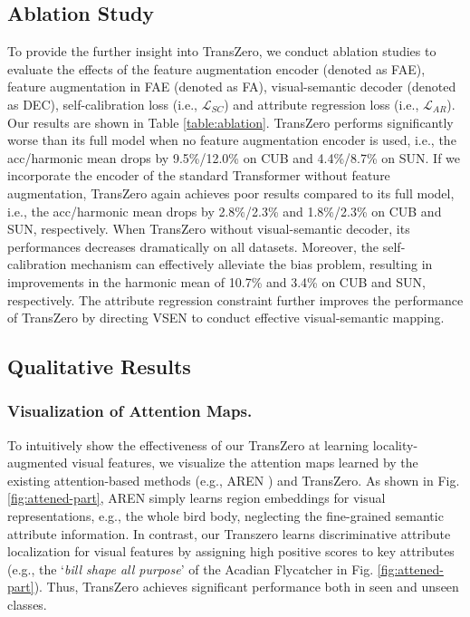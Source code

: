 \documentclass[letterpaper]{article} %
\begin{document}
	\subsection{Ablation Study}\label{sec4.2}	
	To provide the further insight into TransZero, we conduct ablation studies to evaluate the effects of the feature augmentation encoder (denoted as FAE), feature augmentation in FAE (denoted as FA), visual-semantic decoder (denoted as DEC), self-calibration loss (i.e., $\mathcal{L}_{SC}$) and attribute regression loss (i.e.,  $\mathcal{L}_{AR}$). Our results are shown in Table \ref{table:ablation}. TransZero performs significantly worse than its full model when no feature augmentation encoder is used, i.e., the acc/harmonic mean drops by 9.5\%/12.0\% on CUB and 4.4\%/8.7\% on SUN. If we incorporate the encoder of the standard Transformer without feature augmentation, TransZero again achieves poor results compared to its full model, i.e., the acc/harmonic mean drops by 2.8\%/2.3\% and 1.8\%/2.3\% on CUB and SUN, respectively. When TransZero without visual-semantic decoder, its performances decreases dramatically on all datasets. Moreover, the self-calibration mechanism can effectively alleviate the bias problem, resulting in improvements in the harmonic mean of 10.7\% and 3.4\% on CUB and SUN, respectively. The attribute regression constraint further improves the performance of TransZero by directing VSEN to conduct effective visual-semantic mapping.
	
	
	
	
	
	\subsection{Qualitative Results}\label{sec4.3}	
	\subsubsection{Visualization of Attention Maps.} To intuitively show the effectiveness of our TransZero at learning locality-augmented visual features, we visualize the attention maps learned by the existing attention-based methods (e.g., AREN \cite{Xie2019AttentiveRE}) and TransZero. As shown in Fig. \ref{fig:attened-part}, AREN simply learns region embeddings for visual representations, e.g., the whole bird body, neglecting the fine-grained semantic attribute information. In contrast, our Transzero learns discriminative attribute localization for visual features by assigning high positive scores to key attributes (e.g., the ‘\textit{bill shape all purpose}’ of the Acadian Flycatcher in Fig. \ref{fig:attened-part}). Thus, TransZero achieves significant performance both in seen and unseen classes.
	
\end{document}
